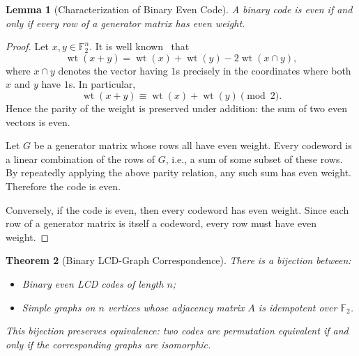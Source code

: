 \documentclass[a4paper,11pt]{article}
\newtheorem{theorem}{Theorem}[section]
\newtheorem{lemma}[theorem]{Lemma}
\theoremstyle{remark}
\newcommand{\FF}{\mathbb{F}}
\DeclareMathOperator{\wt}{wt}
\begin{document}
\begin{lemma}[Characterization of Binary Even Code]\label{lem:evencode}
A binary code is even if and only if every row of a generator matrix has even weight.
\end{lemma}
\begin{proof}
Let $x,y\in \FF_2^n$. It is well known~\cite[Theorem 1.4.3]{huffman2010} that
\[
\wt(x+y)=\wt(x)+\wt(y)-2\wt(x\cap y),
\]
where $x\cap y$ denotes the vector having $1$s precisely in the coordinates where both $x$ and $y$ have $1$s. In particular,
\[
\wt(x+y)\equiv \wt(x)+\wt(y)\pmod 2.
\]
Hence the parity of the weight is preserved under addition: the sum of two even vectors is even.

Let $G$ be a generator matrix whose rows all have even weight. Every codeword is a linear combination of the rows of $G$, i.e., a sum of some subset of these rows. By repeatedly applying the above parity relation, any such sum has even weight. Therefore the code is even.

Conversely, if the code is even, then every codeword has even weight. Since each row of a generator matrix is itself a codeword, every row must have even weight.
\end{proof}


\begin{theorem}[Binary LCD-Graph Correspondence]\label{thm:main-binary}
There is a bijection between:
\begin{itemize}
\item Binary even LCD codes of length $n$;
\item Simple graphs on $n$ vertices whose adjacency matrix $A$ is idempotent over $\FF_2$.
\end{itemize}
This bijection preserves equivalence: two codes are permutation equivalent if and only if the corresponding graphs are isomorphic.
\end{theorem}
\end{document}
